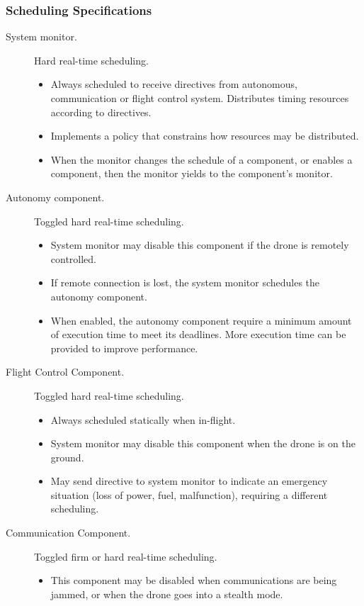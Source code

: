 \subsubsection{Scheduling Specifications}
\begin{description}
	\item[System monitor.] Hard real-time scheduling.
		\begin{itemize}
			\item Always scheduled to receive directives from autonomous, communication or flight control system. Distributes timing resources according to directives.
			\item Implements a policy that constrains how resources may be distributed.
			\item When the monitor changes the schedule of a component, or enables a component, then the monitor yields to the component's monitor.
		\end{itemize}
	\item[Autonomy component.] Toggled hard real-time scheduling.
		\begin{itemize}
			\item System monitor may disable this component if the drone is remotely controlled.
			\item If remote connection is lost, the system monitor schedules the autonomy component.
			\item When enabled, the autonomy component require a minimum amount of execution time to meet its deadlines. More execution time can be provided to improve performance.
		\end{itemize}
	\item[Flight Control Component.] Toggled hard real-time scheduling.
		\begin{itemize}
			\item Always scheduled statically when in-flight.
			\item System monitor may disable this component when the drone is on the ground.
			\item May send directive to system monitor to indicate an emergency situation (loss of power, fuel, malfunction), requiring a different scheduling.
		\end{itemize}
	\item[Communication Component.] Toggled firm or hard real-time scheduling.
		\begin{itemize}
			\item This component may be disabled when communications are being jammed, or when the drone goes into a stealth mode.

\end{itemize}
\end{description}
